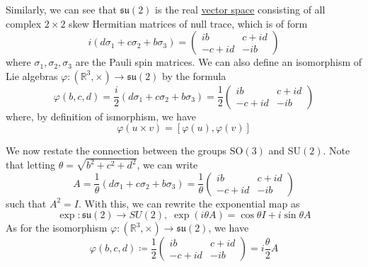 \documentclass{article}
\newcounter{definition}[section]
\newcounter{example}[section]
\begin{document}
      \begin{example}
        \label{ex:the-lie-algebra-mathfraksu2}
        Similarly, we can see that $\mathfrak{su}(2)$ is the real \hyperref[lin-def:vector-space]{vector space} consisting of all complex $2 \times 2$ skew Hermitian matrices of null trace, which is of form
        \begin{equation}
          i(d \sigma_1 + c \sigma_2 + b \sigma_3) = \begin{pmatrix}
          i b & c + i d\\
          -c + i d & - i b
          \end{pmatrix}
        \end{equation}
        where $\sigma_1, \sigma_2, \sigma_3$ are the Pauli spin matrices. We can also define an isomorphism of Lie algebras $\varphi: (\mathbb{R}^3, \times) \rightarrow \mathfrak{su}(2)$ by the formula
        \begin{equation}
          \varphi(b, c, d) = \frac{i}{2} (d \sigma_1 + c \sigma_2 + b \sigma_3) = \frac{1}{2} \begin{pmatrix}
          i b & c + i d\\
          -c + i d & - i b
          \end{pmatrix}
        \end{equation}
        where, by definition of ismorphism, we have
        \begin{equation}
          \varphi(u \times v) = [\varphi(u), \varphi(v)]
        \end{equation}
      \end{example}

      We now restate the connection between the groups SO$(3)$ and SU$(2)$. Note that letting $\theta = \sqrt{b^2 + c^2 + d^2}$, we can write 
      \begin{equation}
        A = \frac{1}{\theta} (d \sigma_1 + c \sigma_2 + b \sigma_3) = \frac{1}{\theta} \begin{pmatrix}
        i b & c + i d\\
        -c + i d & - i b
        \end{pmatrix}
      \end{equation}
      such that $A^2 = I$. With this, we can rewrite the exponential map as 
      \begin{equation}
        \exp: \mathfrak{su}(2) \rightarrow SU(2), \; \exp(i \theta A) = \cos{\theta} I  + i \sin{\theta} A
      \end{equation}
      As for the isomorphism $\varphi: (\mathbb{R}^3, \times) \rightarrow \mathfrak{su}(2)$, we have
      \begin{equation}
        \varphi(b, c, d) \coloneqq \frac{1}{2} \begin{pmatrix}
        i b & c + i d\\
        -c + i d & - i b
        \end{pmatrix} = i \frac{\theta}{2} A
      \end{equation}
\end{document}
